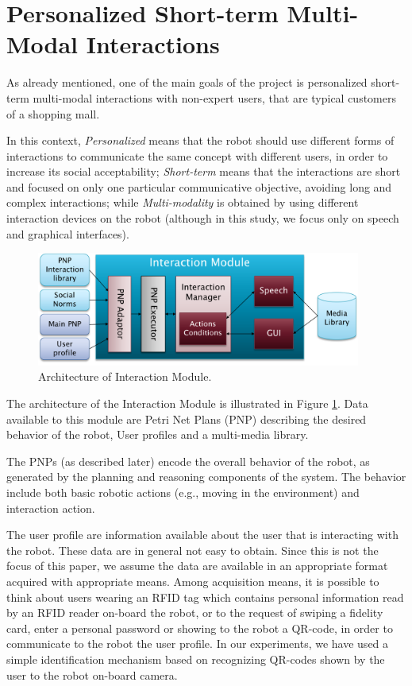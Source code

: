 \section{Personalized Short-term Multi-Modal Interactions}

As already mentioned, 
one of the main goals of the \coaches project is personalized short-term multi-modal interactions with non-expert users, that are typical customers of a shopping mall.

In this context, \emph{Personalized} means that the robot should use different forms of interactions to communicate the same concept with different users, in order to increase its social acceptability;
\emph{Short-term} means that the interactions are short and focused on only one particular communicative objective, avoiding long and complex interactions; while
\emph{Multi-modality} is obtained by using different interaction devices on the robot (although in this study, we focus only on speech and graphical interfaces).



\begin{figure}
\centering
\includegraphics[width=0.95\textwidth]{fig/WP3.png}
\caption{Architecture of Interaction Module.}
\label{fig:WP3}
\end{figure}

The architecture of the Interaction Module is illustrated in Figure \ref{fig:WP3}. Data available to this module are Petri Net Plans (PNP) describing the desired behavior of the robot, User profiles and a multi-media library.

The PNPs (as described later) encode the overall behavior of the robot, as generated by the planning and reasoning components of the system. The behavior include both basic robotic actions (e.g., moving in the environment) and interaction action.

The user profile are information available about the user that is interacting with the robot. These data are in general not easy to obtain. Since this is not the focus of this paper, we assume the data are available in an appropriate format acquired with appropriate means.
Among acquisition means, it is possible to think about users wearing an RFID tag which contains personal information read by an RFID reader on-board the robot, or to the request of swiping a fidelity card, enter a personal password or showing to the robot a QR-code, in order to communicate to the robot the user profile.
In our experiments, we have used a simple identification mechanism based on recognizing QR-codes shown by the user to the robot on-board camera.

